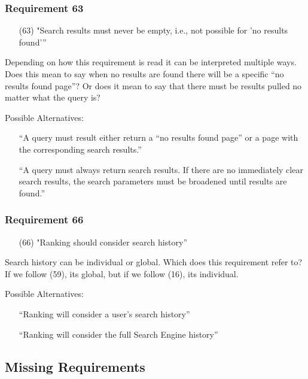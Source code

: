 \subsubsection*{Requirement 63}
\begin{itemize}
  \item[(63)] "Search results must never be empty, i.e., not possible for 'no results found'”
\end{itemize}

Depending on how this requirement is read it can be interpreted multiple ways. Does this mean to say when no results are found there will be a specific “no results found page”?
Or does it mean to say that there must be results pulled no matter what the query is?

\medskip

Possible Alternatives:
\begin{itemize}
  \item[] “A query must result either return a “no results found page” or a page with the corresponding search results.”
  \item[] “A query must always return search results. If there are no immediately clear search results, the search parameters must be broadened until results are found.”
\end{itemize}


\subsubsection*{Requirement 66}
\begin{itemize}
  \item[(66)] "Ranking should consider search history”
\end{itemize}

Search history can be individual or global. Which does this requirement refer to? If we follow (59), its global, but if we follow (16), its individual.

\medskip

Possible Alternatives:
\begin{itemize}
  \item[] “Ranking will consider a user's search history”
  \item[] “Ranking will consider the full Search Engine history”
\end{itemize}

\subsection*{Missing Requirements}
